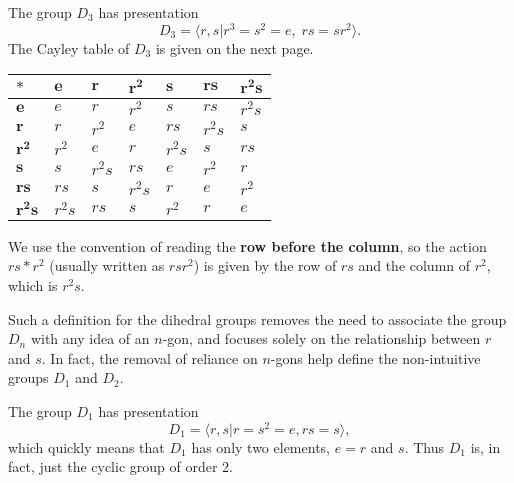 \begin{example}\label{example-presentation-of-D3}
    The group $D_3$ has presentation
    \[
        D_3 = \langle r, s \vert r^3 = s^2 = e,\;rs = sr^2 \rangle.
    \]
    The Cayley table of $D_3$ is given on the next page.

    \begin{table}[H]
        \centering
        \begin{tabular}{|l|l|l|l|l|l|l|}
        \hline
        $\boldsymbol{\ast}$ & $\boldsymbol{e}$ & $\boldsymbol{r}$ & $\boldsymbol{r^2}$ & $\boldsymbol{s}$ & $\boldsymbol{rs}$ & $\boldsymbol{r^2s}$ \\ \hline
        $\boldsymbol{e}$    & $e$    & $r$    & $r^2$  & $s$    & $rs$   & $r^2s$ \\ \hline
        $\boldsymbol{r}$    & $r$    & $r^2$  & $e$    & $rs$   & $r^2s$ & $s$    \\ \hline
        $\boldsymbol{r^2}$  & $r^2$  & $e$    & $r$    & $r^2s$ & $s$    & $rs$   \\ \hline
        $\boldsymbol{s}$    & $s$    & $r^2s$ & $rs$   & $e$    & $r^2$  & $r$    \\ \hline
        $\boldsymbol{rs}$   & $rs$   & $s$    & $r^2s$ & $r$    & $e$    & $r^2$  \\ \hline
        $\boldsymbol{r^2s}$ & $r^2s$ & $rs$   & $s$    & $r^2$  & $r$    & $e$    \\ \hline
        \end{tabular}
    \end{table}

    We use the convention of reading the \textbf{row before the column}, so the action $rs \ast r^2$ (usually written as $rsr^2$) is given by the row of $rs$ and the column of $r^2$, which is $r^2s$.
\end{example}

Such a definition for the dihedral groups removes the need to associate the group $D_n$ with any idea of an $n$-gon, and focuses solely on the relationship between $r$ and $s$. In fact, the removal of reliance on $n$-gons help define the non-intuitive groups $D_1$ and $D_2$.
\begin{example}
    The group $D_1$ has presentation
    \[
        D_1 = \langle r, s \vert r = s^2 = e, rs = s \rangle,
    \]
    which quickly means that $D_1$ has only two elements, $e = r$ and $s$. Thus $D_1$ is, in fact, just the cyclic group of order 2.
\end{example}

